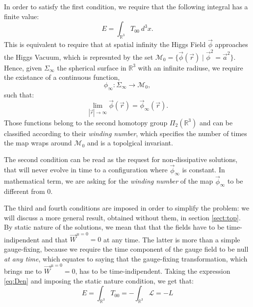 \documentclass[main.tex]{subfiles}
\begin{document}
 In order to satisfy the first condition, we require that the following integral has a finite value: 
 \begin{equation}
 E = \int_{\mathbb{R}^3} T_{00} \ d^3x.
 \end{equation}
 This is equivalent to require that at spatial infinity the Higgs Field $\vec{\phi}$ approaches the Higgs Vacuum, which is represnted by the set $\mathcal{M}_0 = \{ \vec{\phi}(\vec{r})  \mid  \vec{\phi}^2 = \vec{a}^2 \}$. 
 Hence, given $\Sigma_{\infty}$ the spherical surface in $\mathbb{R}^3$ with an infinite radiuse, we require the existance of a continuous function, 
 \begin{equation}
     \phi_{\infty} \colon \Sigma_{\infty}  \to \mathcal{M}_0 ,
  \end{equation}
 such that:
 \begin{equation}
     \lim_{|\vec{r}|\to \infty} \vec{\phi}(\vec{r}) = \vec{\phi}_{\infty}(\vec{r}).
 \end{equation}
  Those functions belong to the second homotopy group $\Pi_2(\mathbb{R}^3)$ and can be classified according to their \textit{winding number}, which specifies the number of times the map wraps around $\mathcal{M}_0$ and is a topolgical invariant.
  \medskip
  
  The second condition can be read as the request for non-dissipative solutions, that will never evolve in time to a configuration where $\vec{\phi}_{\infty}$ is constant. In mathematical term, we are asking for the \textit{winding number} of the map $\vec{\phi}_{\infty}$ to be different from 0.
  \medskip
  
  The third and fourth conditions are imposed in order to simplify the problem: we will discuss a more general result, obtained without them, in section \ref{sect:top}.
  By static nature of the solutions, we mean that that the fields have to be time-indipendent and that $\vec{W}^{\mu = 0}= 0$ at any time. The latter is more than a simple gauge-fixing, because we require the time component of the gauge field to be null \textit{at any time}, which equates to saying that the gauge-fixing transformation, which brings me to $ \vec{W}^{\mu = 0}= 0$, has to be time-indipendent. Taking the expression \ref{eq:Den} and imposing the static nature condition, we get that: 
  \begin{equation}
      E = \int_{\mathbb{R}^3} T_{00} = - \int_{\mathbb{R}^3} \mathcal{L} = -L
      \label{eq:En}
  \end{equation}
 
\end{document}
